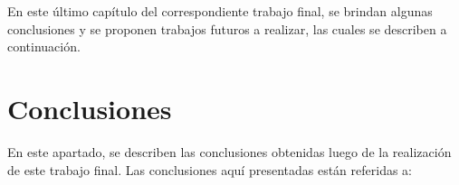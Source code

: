


En este último capítulo del correspondiente trabajo final, se brindan algunas conclusiones y se proponen trabajos futuros a realizar, las cuales se describen a continuación.

\section{Conclusiones}

En este apartado, se describen las conclusiones obtenidas luego de la realización de este trabajo final. Las conclusiones aquí presentadas están referidas a:


